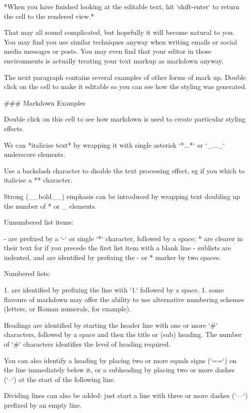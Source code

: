 \documentclass[letterpaper,10pt,english]{sphinxmanual}
\begin{document}
*When you have finished looking at the editable text, hit `shift-enter` to return the cell to the rendered view.*

That may all sound complicated, but hopefully it will become natural to you. You may find you use similar techniques anyway when writing emails or social media messages or posts. You may even find that your editor in those environments is actually treating your text markup as markdown anyway.

The next paragraph contains several examples of other forms of mark up. Double click on the cell to make it editable so you can see how the styling was generated.

### Markdown Examples

Double click on this cell to see how markdown is used to create particular styling effects.

We can *italicise text* by wrapping it with single asterisk `*...*` or `_..._` underscore elements.

Use a backslash character to disable the text processing effect, eg if you which to italicise a *\** character.

Strong (__bold__) emphasis can be introduced by wrapping text doubling up the number of * or _ elements.

Unnumbered list items:

- are prefixed by a `-` or single `*` character, followed by a space;
* are clearer in their text for if you precede the first list item with a blank line
  - sublists are indented, and are identified by prefixing the - or * marker by two spaces.

Numbered lists:

1. are identified by prefixing the line with `1.` followed by a space.
1. some flavours of markdown may offer the ability to use alternative numbering schemes (letters, or Roman numerals, for example).


Headings are identified by starting the header line with one or more `#` characters, followed by a space and then the title or (sub) heading. The number of `#` characters identifies the level of heading required.

You can also identify a heading by placing two or more equals signs (`==`) on the line immediately below it, or a subheading by placing two or more dashes (`--`) at the start of the following line.

Dividing lines can also be added: just start a line with three or more dashes (`---`) prefixed by an empty line.
\end{document}
